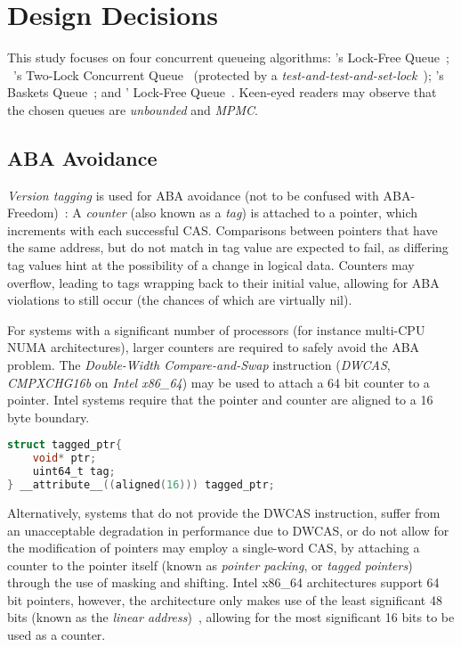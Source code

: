 \section{Design Decisions\label{sec:design_and_implementation_design_decisions}}
This study focuses on four concurrent queueing algorithms:
\citeauthor{michael1996simple}'s Lock-Free Queue~\citep{michael1996simple};
~\citeauthor{michael1996simple}'s Two-Lock Concurrent
Queue~\citep{michael1996simple} (protected by a \emph{test-and-test-and-set-lock}~\citep{mellor1991algorithms}); \citeauthor{hoffman2007baskets}'s Baskets
Queue~\citep{hoffman2007baskets}; and \citeauthor{valois1994queues}' Lock-Free
Queue~\citep{valois1994queues}. Keen-eyed readers may observe that the chosen
queues are \emph{unbounded} and \emph{MPMC}.

\subsection{ABA Avoidance}

\emph{Version tagging} is used for ABA avoidance (not to be confused with
ABA-Freedom)~\citep{dechev2010understanding}:
A \emph{counter} (also known as a \emph{tag}) is attached to a pointer, which increments with
each successful CAS. Comparisons between pointers that have the same address,
but do not match in tag value are expected to fail, as differing tag values hint
at the possibility of a change in logical data. Counters may overflow, leading to tags wrapping back
to their initial value, allowing for ABA violations to still occur (the chances
of which are virtually nil).

For systems with a significant number of processors (for instance multi-CPU
NUMA architectures), larger counters are required  to safely avoid the ABA
problem. The \emph{Double-Width Compare-and-Swap} instruction (\emph{DWCAS},
\emph{CMPXCHG16b} on \emph{Intel x86\_64}) may be used to attach a 64 bit
counter to a pointer. 
Intel systems require that the pointer and counter are aligned to a 16 byte
boundary.

\begin{lstlisting}[language=C,caption={Struct aligned to 16 bytes, as required by the DWCAS instruction.}]
struct tagged_ptr{
    void* ptr;
    uint64_t tag;
} __attribute__((aligned(16))) tagged_ptr;
\end{lstlisting}

Alternatively, systems that do not provide the DWCAS instruction, suffer from
an unacceptable degradation in performance due to DWCAS, or do not allow for
the modification of pointers may employ a single-word CAS, by attaching a
counter to the pointer itself (known as \emph{pointer packing}, or \emph{tagged
pointers}) through the use of masking and shifting. Intel x86\_64 architectures support 64 bit pointers, however, the
architecture only makes use of the least significant 48 bits (known as the
\emph{linear address})~\citep[Section~3.3.7.1]{intel2021system}, allowing for
the most significant 16 bits to be used as a counter.

